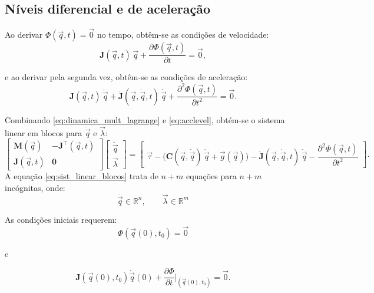 \subsection{Níveis diferencial e de aceleração}
Ao derivar
$\Phi(\vec q,t)=\vec 0$
no tempo, obtêm-se as condições de velocidade:
\begin{equation}
\mathbf{J}(\vec q,t)\,\dot{\vec q}
+\frac{\partial \Phi(\vec q,t)}{\partial t}
=\vec 0,
\label{eq:vellevel}
\end{equation}

e ao derivar pela segunda vez, obtêm-se as condições de aceleração:
\begin{equation}
\mathbf{J}(\vec q,t)\,\ddot{\vec q}
+\dot{\mathbf{J}}(\vec q,\dot{\vec q},t)\,\dot{\vec q}+\frac{\partial^2 \Phi(\vec q,t)}{\partial t^2}
=\vec 0.
\label{eq:acclevel}
\end{equation}

Combinando \eqref{eq:dinamica_mult_lagrange} e
\eqref{eq:acclevel},
obtém-se o sistema linear em blocos para
$\ddot{\vec q}$ e $\vec\lambda$:
\begin{equation}
\begin{bmatrix}
\mathbf M(\vec q)   & -\mathbf{J}^{\top}(\vec q,t)\\
\mathbf{J}(\vec q,t) & \mathbf 0
\end{bmatrix}
\begin{bmatrix}
\ddot{\vec q}\\
\vec\lambda
\end{bmatrix}
=
\begin{bmatrix}
\vec\tau
-\big(\mathbf C(\vec q,\dot{\vec q})\,\dot{\vec q}
+\vec g(\vec q)\big)
-\dot{\mathbf{J}}(\vec q,\dot{\vec q},t)\,\dot{\vec q}-\dfrac{\partial^2 \Phi(\vec q,t)}{\partial t^2}
\end{bmatrix}.
\label{eq:sist_linear_blocos}
\end{equation}
A equação \eqref{eq:sist_linear_blocos} trata de
$n{+}m$ equações para $n{+}m$ incógnitas,
onde:
\begin{equation}
\ddot{\vec q}\in\mathbb {R}^{n},
\qquad
\vec\lambda\in\mathbb {R}^{m}
\end{equation}


As condições iniciais requerem:
\begin{equation}
	\label{eq:ci_sist_linear_blocos1}
\Phi(\vec q(0),t_0)=\vec 0 
\end{equation}

e

\begin{equation}
	\label{eq:ci_sist_linear_blocos2}
\mathbf{J}(\vec q(0),t_0)\dot{\vec q}(0)
+\frac{\partial\Phi}{\partial t}\big|_{(\vec q(0),t_0)}=\vec 0.
\end{equation}


